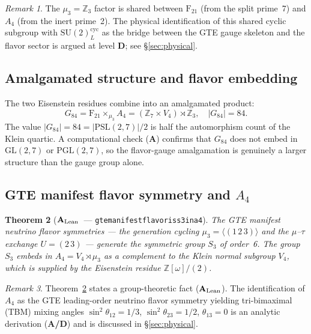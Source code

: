 \documentclass[11pt]{article}
\newtheorem{theorem}{Theorem}[section]
\theoremstyle{remark}
\newtheorem{remark}[theorem]{Remark}
\newcommand{\lean}[1]{%
  \penalty-100
  \begingroup\def\_{\textunderscore\allowbreak}\texttt{#1}\endgroup}
\newcommand{\PSLtwo}{\ensuremath{\mathrm{PSL}(2,7)}}
\newcommand{\PGLtwo}{\ensuremath{\mathrm{PGL}(2,7)}}
\newcommand{\FineSeven}{\ensuremath{\mathrm{F}_{21}}}
\newcommand{\Zcyc}[1]{\ensuremath{\mathbb{Z}_{#1}}}
\newcommand{\AltFour}{\ensuremath{A_4}}
\newcommand{\KleinFour}{\ensuremath{V_4}}
\newcommand{\Eisenstein}{\ensuremath{\mathbb{Z}[\omega]}}
\newcommand{\CatA}{\textbf{A}}
\newcommand{\CatAL}{\ensuremath{\textbf{A}_{\rm Lean}}}
\newcommand{\CatAD}{\textbf{A/D}}
\newcommand{\CatD}{\textbf{D}}
\begin{document}
\begin{remark}
The $\mu_3 = \Zcyc{3}$ factor is shared between $\FineSeven$ (from the split
prime~7) and $\AltFour$ (from the inert prime~2).
The physical identification of this shared cyclic subgroup with
$\mathrm{SU}(2)_L^{\mathrm{cyc}}$ as the bridge between the GTE gauge skeleton
and the flavor sector is argued at level \CatD{}; see \S\ref{sec:physical}.
\end{remark}

\subsection{Amalgamated structure and flavor embedding}

The two Eisenstein residues combine into an amalgamated product:
\begin{equation}
  G_{84} = \FineSeven \times_{\mu_3} \AltFour
  = (\Zcyc{7} \times \KleinFour) \rtimes \Zcyc{3},
  \quad |G_{84}| = 84.
\end{equation}
The value $|G_{84}| = 84 = |\PSLtwo|/2$ is half the automorphism count of the
Klein quartic.
A computational check (\CatA) confirms that $G_{84}$ does not embed in
$\mathrm{GL}(2,7)$ or $\PGLtwo$, so the flavor-gauge amalgamation is genuinely
a larger structure than the gauge group alone.

\subsection{GTE manifest flavor symmetry and \texorpdfstring{$\AltFour$}{A4}}

\begin{theorem}[\CatAL\ --- \lean{gte\_manifest\_flavor\_is\_s3\_in\_a4}]
\label{thm:s3_in_a4}
The GTE manifest neutrino flavor symmetries --- the generation cycling $\mu_3 =
\langle(1\,2\,3)\rangle$ and the $\mu$--$\tau$ exchange $U = (2\,3)$ --- generate
the symmetric group $S_3$ of order~6.
The group $S_3$ embeds in $\AltFour = \KleinFour \rtimes \mu_3$ as a complement
to the Klein normal subgroup $\KleinFour$, which is supplied by the Eisenstein
residue $\Eisenstein/(2)$.
\end{theorem}

\begin{remark}
Theorem~\ref{thm:s3_in_a4} states a group-theoretic fact (\CatAL).
The identification of $\AltFour$ as the GTE leading-order neutrino flavor
symmetry yielding tri-bimaximal (TBM) mixing angles $\sin^2\theta_{12} = 1/3$,
$\sin^2\theta_{23} = 1/2$, $\theta_{13} = 0$ is an analytic derivation
(\CatAD) and is discussed in \S\ref{sec:physical}.
\end{remark}
\end{document}
